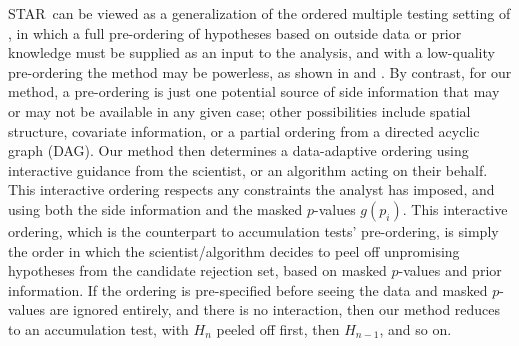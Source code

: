\documentclass{biometrika}
\newcommand{\Star}{STAR}
\renewcommand{\star}{STAR}
\newcommand{\DAG}{DAG}
\newcommand{\1}{\mathbf{1}}
\begin{document}
\Star ~can be viewed as a generalization of the ordered multiple testing setting of \citet{li2016accumulation}, in which a full pre-ordering of hypotheses based on outside data or prior knowledge must be supplied as an input to the analysis, and with a low-quality pre-ordering the method may be powerless, as shown in \citet{li2016accumulation} and \citet{lei2016power}. 
By contrast, for our method, a pre-ordering is just one potential source of side information that may or may not be available in any given case; other possibilities include spatial structure, covariate information, or a partial ordering from a directed acyclic graph (\DAG). Our method then determines a data-adaptive ordering using interactive guidance from the scientist, or an algorithm acting on their behalf. This interactive ordering respects any constraints the analyst has imposed, and using both the side information and the masked $p$-values $g(p_i)$. This interactive ordering, which is the counterpart to accumulation tests' pre-ordering, is simply the order in which the scientist/algorithm decides to peel off unpromising hypotheses from the candidate rejection set, based on masked $p$-values and prior information. If the ordering is pre-specified before seeing the data and masked $p$-values are ignored entirely, and there is no interaction, then our method reduces to an accumulation test, with $H_n$ peeled off first, then $H_{n-1}$, and so on.
\end{document}
